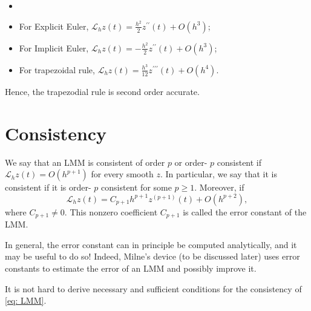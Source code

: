 \begin{proposition}
\label{prop: LTE for 3 methods}
\begin{itemize}
    \item []
    \item For Explicit Euler, $ \mathscr{L}_h z(t) = \frac{h^{2} }{2}z^{\prime \prime }(t) +O(h^3) $; 
    \item For Implicit Euler, $ \mathscr{L}_h z(t) = -\frac{h^{2} }{2}z^{\prime \prime }(t) +O(h^3) $; 
    \item For trapezoidal rule, $ \mathscr{L}_h z(t) = \frac{h^{3} }{12}z^{\prime \prime  \prime}(t) +O(h^4) $.
\end{itemize}
\end{proposition}

Hence, the trapezodial rule is second order accurate.  


\section{Consistency} 


\begin{definition}
[Consistency]
\label{def: Consistency}
We say that an LMM is consistent of order $p$ or order- $p$ consistent if $\mathscr{L}_h z(t)=O\left(h^{p+1}\right)$ for every smooth $z$. In particular, we say that it is consistent if it is order- $p$ consistent for some $p \geq 1$. Moreover, if 
\[
    \mathscr{L}_h z(t)=C_{p+1} h^{p+1} z^{(p+1)}(t)+O\left(h^{p+2}\right),
\]
where $C_{p+1} \neq 0$. This nonzero coefficient $C_{p+1}$ is called the error constant of the LMM. 
\end{definition}
In general, the error constant can in principle be computed analytically, and it may be useful to do so! Indeed, Milne's device (to be discussed later) uses error constants to estimate the error of an LMM and possibly improve it.

 It is not hard to derive necessary and sufficient conditions for the consistency of \eqref{eq: LMM}.
 
